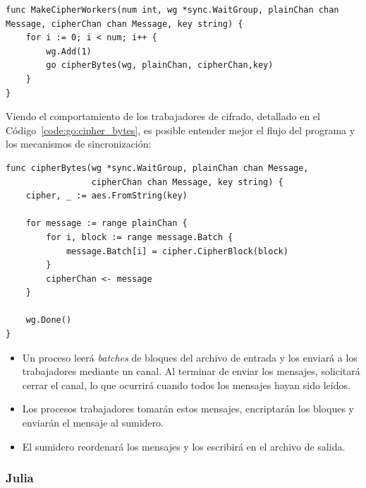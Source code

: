 \documentclass[11pt]{article}
\let\Oldsubsubsection\subsubsection
\renewcommand{\subsubsection}{\FloatBarrier\Oldsubsubsection}
\newcommand{\english}[1]{\textit{#1}}
\begin{document}
\begin{listing}[h]
\begin{verbatim}
func MakeCipherWorkers(num int, wg *sync.WaitGroup, plainChan chan Message, cipherChan chan Message, key string) {
	for i := 0; i < num; i++ {
		wg.Add(1)
		go cipherBytes(wg, plainChan, cipherChan,key)
	}
}
\end{verbatim}
\caption{Definición de la función \lstinline{cipherBytes} en Go, que cifra un conjunto de bloques recibidos a través de un \lstinline{channel}}
\label{code:go:cipher_workers}
\end{listing}

Viendo el comportamiento de los trabajadores de cifrado, detallado en el Código~\ref{code:go:cipher_bytes}, es posible entender mejor el flujo del programa y los mecanismos de sincronización:

\begin{listing}[h]
\begin{verbatim}
func cipherBytes(wg *sync.WaitGroup, plainChan chan Message,
                 cipherChan chan Message, key string) {	
    cipher, _ := aes.FromString(key)

    for message := range plainChan {
        for i, block := range message.Batch {
            message.Batch[i] = cipher.CipherBlock(block)
        }
        cipherChan <- message
    }

    wg.Done()
}
\end{verbatim}
\caption{Definición de la función \lstinline{cipherBytes} en Go, que cifra un conjunto de bloques recibidos a través de un \lstinline{channel}}
\label{code:go:cipher_bytes}
\end{listing}

\begin{itemize}
    \item Un proceso leerá \english{batches} de bloques del archivo de entrada y los enviará a los trabajadores mediante un canal. Al terminar de enviar los mensajes, solicitará cerrar el canal, lo que ocurrirá cuando todos los mensajes hayan sido leídos.
    \item Los procesos trabajadores tomarán estos mensajes, encriptarán los bloques y enviarán el mensaje al sumidero.
    \item El sumidero reordenará los mensajes y los escribirá en el archivo de salida.
\end{itemize}

\subsubsection{Julia}
\end{document}
